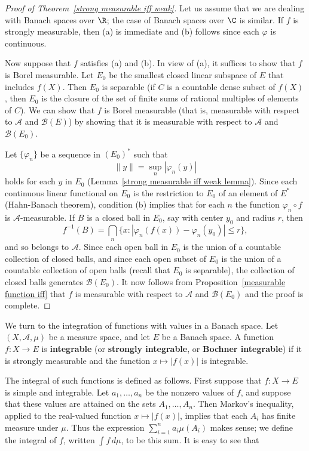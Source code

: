 \begin{proof}[Proof of Theorem~\ref{strong measurable iff weak}]
Let us assume that we are dealing with Banach spaces over $\R$; the case of Banach spaces over $\C$ is similar. If $f$ is strongly measurable, then (a) is immediate and (b) follows since each $\varphi$ is continuous.\par
Now suppose that $f$ satisfies (a) and (b). In view of (a), it suffices to show that $f$ is Borel measurable. Let $E_0$ be the smallest closed linear subspace of $E$ that includes $f(X)$. Then $E_0$ is separable (if $C$ is a countable dense subset of $f(X)$, then $E_0$ is the closure of the set of finite sums of rational multiples of elements of $C$). We can show that $f$ is Borel measurable (that is, measurable with respect to $\mathcal{A}$ and $\mathcal{B}(E)$) by showing that it is measurable with respect to $\mathcal{A}$ and $\mathcal{B}(E_0)$.\par
Let $\{\varphi_n\}$ be a sequence in $(E_0)^*$ such that
\[\|y\|=\sup_n|\varphi_n(y)|\]
holds for each $y$ in $E_0$ (Lemma~\ref{strong measurable iff weak lemma}). Since each continuous linear functional on $E_0$ is the restriction to $E_0$ of an element of $E^*$ (Hahn-Banach theorem), condition (b) implies that for each $n$ the function $\varphi_n\circ f$ is $\mathcal{A}$-measurable. If $B$ is a closed ball in $E_0$, say with center $y_0$ and radius $r$, then
\[f^{-1}(B)=\bigcap_n\{x:|\varphi_n(f(x))-\varphi_n(y_0)|\leq r\},\]
and so belongs to $\mathcal{A}$. Since each open ball in $E_0$ is the union of a countable collection of closed balls, and since each open subset of $E_0$ is the union of a countable collection of open balls (recall that $E_0$ is separable), the collection of closed balls generates $\mathcal{B}(E_0)$. It now follows from Proposition~\ref{measurable function iff} that $f$ is measurable with respect to $\mathcal{A}$ and $\mathcal{B}(E_0)$ and the proof is complete.
\end{proof}
We turn to the integration of functions with values in a Banach space. Let $(X,\mathcal{A},\mu)$ be a measure space, and let $E$ be a Banach space. A function $f:X\to E$ is \textbf{integrable} (or \textbf{strongly integrable}, or \textbf{Bochner integrable}) if it is strongly measurable and the function $x\mapsto|f(x)|$ is integrable.\par
The integral of such functions is defined as follows. First suppose that $f:X\to E$ is simple and integrable. Let $a_1,\dots,a_n$ be the nonzero values of $f$, and suppose that these values are attained on the sets $A_1,\dots,A_n$. Then Markov's inequality, applied to the real-valued function $x\mapsto|f(x)|$, implies that each $A_i$ has finite measure under $\mu$. Thus the expression $\sum_{i=1}^{n}a_i\mu(A_i)$ makes sense; we define the integral of $f$, written $\int f\,d\mu$, to be this sum. It is easy to see that
